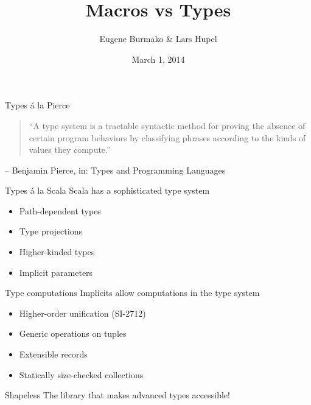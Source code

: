 \documentclass{beamer}
\begin{document}
  \title{Macros vs Types}
  \author{Eugene Burmako \& Lars Hupel}
  \date{March 1, 2014}

{
\begin{frame}
  \titlepage
\end{frame}
}

\begin{frame}
\vskip40pt
\begin{center}
\end{center}
\end{frame}

\begin{frame}{Types \'a la Pierce}
  \begin{quote}
    ``A type system is a tractable syntactic method for \alert<2>{proving the absence of certain program behaviors} by classifying phrases according to the kinds of values they compute.''
  \end{quote}
  \hfill -- Benjamin Pierce, in: Types and Programming Languages
\end{frame}

\begin{frame}{Types \'a la Scala}
  Scala has a sophisticated type system
  \begin{itemize}
    \item Path-dependent types
    \item Type projections
    \item Higher-kinded types
    \item Implicit parameters
  \end{itemize}
\end{frame}

\begin{frame}{Type computations}
  Implicits allow computations in the type system

  \begin{itemize}
    \item Higher-order unification (SI-2712)
    \item Generic operations on tuples
    \item Extensible records
    \item Statically size-checked collections
  \end{itemize}
\end{frame}

\begin{frame}{Shapeless}
  The library that makes advanced types accessible!
\end{frame}
\end{document}
